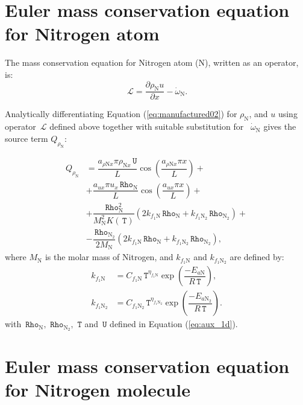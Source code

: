 \documentclass[10pt]{article}
\newcommand{\diff}[2] {\dfrac{\partial #1 }{\partial #2}}
\newcommand{\Lo}{\,\mathcal{L}}
\newcommand{\Rho}{\,\mathtt{Rho}}
\newcommand{\T}{\,\mathtt{T}}
\newcommand{\U}{\,\mathtt{U}}
\begin{document}
\section{Euler mass conservation equation for Nitrogen atom}

The mass conservation equation for Nitrogen atom (N), written as an operator, is:
\begin{equation*}
 \label{eq:euler1d_11}
\Lo =  \diff{\rho_\text{N} u}{x} - \dot{\omega}_{\text{N}}.
\end{equation*}

Analytically differentiating Equation (\ref{eq:manufactured02}) for $\rho_{\text{N}}$,  and $u$ using operator $\Lo$ defined above together with suitable substitution for ~$\dot{\omega}_\text{N}$ gives the source term $Q_{\rho_{\text{N}}}$:


\begin{equation}
\begin{split}
Q_{\rho_\text{N}}&= \dfrac{a_{ \rho \text{N} x} \pi \rho_{\text{N}x} \U }{L}\cos\left(\dfrac{a_{ \rho \text{N} x} \pi x}{L}\right)+\\
&+\dfrac{a_{ux} \pi u_x \Rho_\text{N} }{L}\cos\left(\dfrac{a_{ux} \pi x}{L}\right)+\\
&+ \dfrac{\Rho_\text{N}^2}{M_{\text{N}}^2 K(\T)}\left(2 k_{f_1 \text{N}} \Rho_\text{N}+k_{f_1 \text{N}_2} \Rho_{\text{N}_2}\right)  +\\
&-\dfrac{\Rho_{\text{N}_2}}{2M_{\text{N}}}\left(2 k_{f_1 \text{N}} \Rho_\text{N}+k_{f_1 \text{N}_2} \Rho_{\text{N}_2}\right) ,
\end{split}
\end{equation}
where $M_{\text{N}}$ is the molar mass of Nitrogen, and $k_{f_1 \text{N}}$ and $k_{f_1 \text{N}_2}$ are defined by:
\begin{equation}
 \begin{split}\label{eq:forward_rates}
k_{f_1 \text{N}} &= C_{f_1 \text{N}} \T^{\eta_{f_1 \text{N}}} \exp\left(\dfrac{-E_{a\text{N}}}{R \T}\right),\\
k_{f_1 \text{N}_2} &= C_{f_1 \text{N}_2} \T^{\eta_{f_1 \text{N}_2}} \exp\left(\dfrac{-E_{a\text{N}_2}}{R \T}\right).
 \end{split}
\end{equation}
with $\Rho_{\text{N}},\,\Rho_{\text{N}_2},\, \T$ and $\U$ defined in Equation (\ref{eq:aux_1d}).

\section{Euler mass conservation equation for Nitrogen molecule}
\end{document}
